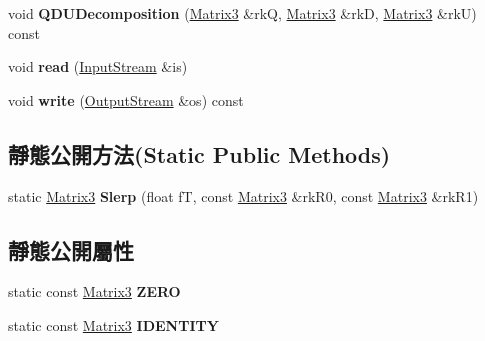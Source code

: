 \begin{DoxyCompactItemize}
\item 
void {\bfseries Q\+D\+U\+Decomposition} (\hyperlink{class_i_dream_sky_1_1_matrix3}{Matrix3} \&rkQ, \hyperlink{class_i_dream_sky_1_1_matrix3}{Matrix3} \&rkD, \hyperlink{class_i_dream_sky_1_1_matrix3}{Matrix3} \&rkU) const \hypertarget{class_i_dream_sky_1_1_matrix3_a82b8de244e3f77a435267b0b73da37cb}{}\label{class_i_dream_sky_1_1_matrix3_a82b8de244e3f77a435267b0b73da37cb}

\item 
void {\bfseries read} (\hyperlink{class_i_dream_sky_1_1_input_stream}{Input\+Stream} \&is)\hypertarget{class_i_dream_sky_1_1_matrix3_aeca95da0a0c3cc0c63595058ae6e3adc}{}\label{class_i_dream_sky_1_1_matrix3_aeca95da0a0c3cc0c63595058ae6e3adc}

\item 
void {\bfseries write} (\hyperlink{class_i_dream_sky_1_1_output_stream}{Output\+Stream} \&os) const \hypertarget{class_i_dream_sky_1_1_matrix3_a413d92e8939488f5d6147b36df1c4180}{}\label{class_i_dream_sky_1_1_matrix3_a413d92e8939488f5d6147b36df1c4180}

\end{DoxyCompactItemize}
\subsection*{靜態公開方法(Static Public Methods)}
\begin{DoxyCompactItemize}
\item 
static \hyperlink{class_i_dream_sky_1_1_matrix3}{Matrix3} {\bfseries Slerp} (float fT, const \hyperlink{class_i_dream_sky_1_1_matrix3}{Matrix3} \&rk\+R0, const \hyperlink{class_i_dream_sky_1_1_matrix3}{Matrix3} \&rk\+R1)\hypertarget{class_i_dream_sky_1_1_matrix3_adbd8dbc198902751e224a4cb2245f5fb}{}\label{class_i_dream_sky_1_1_matrix3_adbd8dbc198902751e224a4cb2245f5fb}

\end{DoxyCompactItemize}
\subsection*{靜態公開屬性}
\begin{DoxyCompactItemize}
\item 
static const \hyperlink{class_i_dream_sky_1_1_matrix3}{Matrix3} {\bfseries Z\+E\+RO}\hypertarget{class_i_dream_sky_1_1_matrix3_a2c124ecb12e7ce1635d0b146c6679076}{}\label{class_i_dream_sky_1_1_matrix3_a2c124ecb12e7ce1635d0b146c6679076}

\item 
static const \hyperlink{class_i_dream_sky_1_1_matrix3}{Matrix3} {\bfseries I\+D\+E\+N\+T\+I\+TY}\hypertarget{class_i_dream_sky_1_1_matrix3_ad7b90e3fae2bf05559fbee367a45b9ce}{}\label{class_i_dream_sky_1_1_matrix3_ad7b90e3fae2bf05559fbee367a45b9ce}

\end{DoxyCompactItemize}


